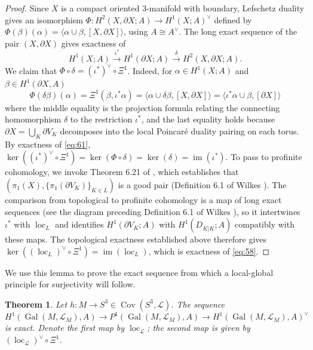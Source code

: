 \documentclass{amsart}
\theoremstyle{plain}
\newtheorem{theorem}{Theorem}[section]
\theoremstyle{definition}
\theoremstyle{plain}
\theoremstyle{plain}
\theoremstyle{plain}
\theoremstyle{remark}
\theoremstyle{remark}
\theoremstyle{plain}
\theoremstyle{definition}
\theoremstyle{plain}
\DeclareMathOperator{\Gal}{\mathrm{Gal}}
\DeclareMathOperator{\Cov}{\mathrm{Cov}}
\DeclareMathOperator{\loc}{\mathrm{loc}}
\DeclareMathOperator{\im}{\mathrm{im}}
\theoremstyle{plain}
\theoremstyle{plain}
\numberwithin{equation}{section}
\begin{document}
\begin{proof}
Since $X$ is a compact oriented 3-manifold with boundary, Lefschetz duality gives an isomorphism $\Phi: H^2(X, \partial X; A) \to H^1(X; A)^\vee$ defined by $\Phi(\beta)(\alpha) = \langle \alpha \cup \beta, [X, \partial X] \rangle$, using $A \cong A^\vee$. The long exact sequence of the pair $(X, \partial X)$ gives exactness of
\begin{equation}\label{eq:61}
    H^1(X; A) \xrightarrow{\iota^*} H^1(\partial X; A) \xrightarrow{\delta} H^2(X, \partial X; A).
\end{equation}
We claim that $\Phi \circ \delta = (\iota^*)^\vee \circ \Xi^1$. Indeed, for $\alpha \in H^1(X; A)$ and $\beta \in H^1(\partial X, A)$
\begin{equation}
    \Phi(\delta\beta)(\alpha) = \Xi^1(\beta, \iota^*\alpha) = \langle \alpha \cup \delta\beta, [X, \partial X] \rangle = \langle \iota^*\alpha \cup \beta, [\partial X] \rangle
\end{equation}
where the middle equality is the projection formula relating the connecting homomorphism $\delta$ to the restriction $\iota^*$, and the last equality holds because $\partial X = \bigcup_K\partial V_K$ decomposes into the local Poincar\'e duality pairing on each torus. By exactness of \ref{eq:61}, $\ker((\iota^*)^\vee \circ \Xi^1) = \ker(\Phi \circ \delta) = \ker(\delta) = \im(\iota^*)$. To pass to profinite cohomology, we invoke Theorem 6.21 of \cite{wilkes}, which establishes that $(\pi_1(X), \{\pi_1(\partial V_K)\}_{K \in L})$ is a good pair (Definition 6.1 of Wilkes \cite{wilkes}). The comparison from topological to profinite cohomology is a map of long exact sequences (see the diagram preceding Definition 6.1 of Wilkes \cite{wilkes}), so it intertwines $\iota^*$ with $\loc_L$ and identifies $H^1(\partial V_K; A)$ with $H^1(D_{\overline{K}|K}; A)$ compatibly with these maps. The topological exactness established above therefore gives $\ker((\loc_L)^\vee \circ \Xi^1) = \im(\loc_L)$, which is exactness of \ref{eq:58}.
\end{proof}

We use this lemma to prove the exact sequence from which a local-global principle for surjectivity will follow.

\begin{theorem}\label{thm:exact}
Let $h: M \to S^3 \in \Cov(S^3, \mathcal{L})$. The sequence
\begin{equation}
    H^1(\Gal(M, \mathcal{L}_M), A) \to P^1(\Gal(M, \mathcal{L}_M), A) \to H^1(\Gal(M, \mathcal{L}_M), A)^\vee
\end{equation}
is exact. Denote the first map by $\loc_{\mathcal{L}}$; the second map is given by $(\loc_\mathcal{L})^\vee \circ \Xi^1$.
\end{theorem}
\end{document}
